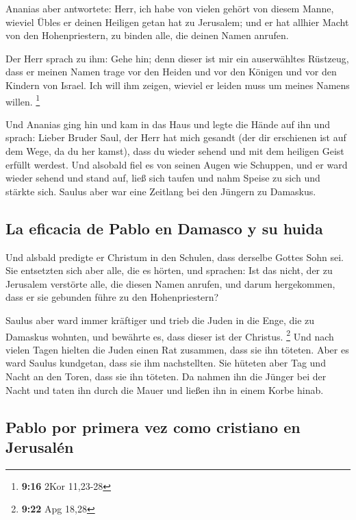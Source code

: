  Ananias aber antwortete: Herr, ich habe von vielen
gehört von diesem Manne, wieviel Übles er deinen Heiligen getan hat zu
Jerusalem;  und er hat allhier Macht von den
Hohenpriestern, zu binden alle, die deinen Namen anrufen.

 Der Herr sprach zu ihm: Gehe hin; denn dieser ist mir
ein auserwähltes Rüstzeug, dass er meinen Namen trage vor den Heiden und
vor den Königen und vor den Kindern von Israel.  Ich will
ihm zeigen, wieviel er leiden muss um meines Namens willen. \footnote{\textbf{9:16}
  2Kor 11,23-28}

 Und Ananias ging hin und kam in das Haus und legte die
Hände auf ihn und sprach: Lieber Bruder Saul, der Herr hat mich gesandt
(der dir erschienen ist auf dem Wege, da du her kamst), dass du wieder
sehend und mit dem heiligen Geist erfüllt werdest.  Und
alsobald fiel es von seinen Augen wie Schuppen, und er ward wieder
sehend  und stand auf, ließ sich taufen und nahm Speise
zu sich und stärkte sich. Saulus aber war eine Zeitlang bei den Jüngern
zu Damaskus.

\hypertarget{la-eficacia-de-pablo-en-damasco-y-su-huida}{%
\subsection{La eficacia de Pablo en Damasco y su
huida}\label{la-eficacia-de-pablo-en-damasco-y-su-huida}}

 Und alsbald predigte er Christum in den Schulen, dass
derselbe Gottes Sohn sei.  Sie entsetzten sich aber alle,
die es hörten, und sprachen: Ist das nicht, der zu Jerusalem verstörte
alle, die diesen Namen anrufen, und darum hergekommen, dass er sie
gebunden führe zu den Hohenpriestern?

 Saulus aber ward immer kräftiger und trieb die Juden in
die Enge, die zu Damaskus wohnten, und bewährte es, dass dieser ist der
Christus. \footnote{\textbf{9:22} Apg 18,28}  Und nach
vielen Tagen hielten die Juden einen Rat zusammen, dass sie ihn töteten.
 Aber es ward Saulus kundgetan, dass sie ihm
nachstellten. Sie hüteten aber Tag und Nacht an den Toren, dass sie ihn
töteten.  Da nahmen ihn die Jünger bei der Nacht und
taten ihn durch die Mauer und ließen ihn in einem Korbe hinab.

\hypertarget{pablo-por-primera-vez-como-cristiano-en-jerusaluxe9n}{%
\subsection{Pablo por primera vez como cristiano en
Jerusalén}\label{pablo-por-primera-vez-como-cristiano-en-jerusaluxe9n}}

